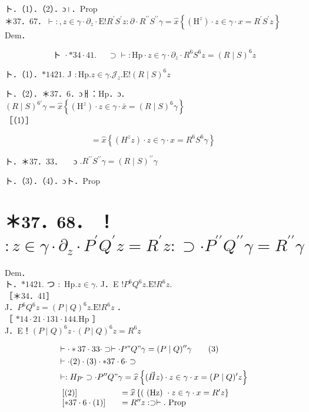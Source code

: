 \documentclass[10pt]{article}
\begin{document}
ト．（1）．（2）．ɔ।．Prop\\
＊37．67．$\vdash:, z \in \gamma \cdot \partial_{z} \cdot \mathrm{E}!R^{\prime} S^{\prime} z: \partial \cdot R^{\prime \prime} S^{\prime \prime} \gamma=\widehat{x}\left\{\left(\mathrm{H}^{z}\right) \cdot z \in \gamma \cdot x=R^{\prime} S^{\prime} z\right\}$ Dem．


\begin{equation*}
\text { ト } \cdot * 34 \cdot 41 \text {. } \quad \supset \vdash: \mathrm{Hp} \cdot z \in \gamma \cdot \partial_{z} \cdot R^{6} S^{6} z=(R \mid S)^{6} z \tag{1}
\end{equation*}


ト．（1）．$* 1421$. J $: \mathrm{Hp} . z \in \gamma . \mathcal{J}_{z} . \mathrm{E}!(R \mid S)^{6} z$

ト．（2）．＊37．6．ɔㅐ：Hp．ɔ．$(R \mid S)^{6 \prime} \gamma=\widehat{x}\left\{\left(\mathrm{H}^{z}\right) \cdot z \in \gamma \cdot \bar{x}=(R \mid S)^{6} \gamma\right\}$\\
［（1）］


\begin{equation*}
=\hat{x}\left\{\left(H^{z} z\right) \cdot z \in \gamma \cdot x=R^{6} S^{6} \gamma\right\} \tag{2}
\end{equation*}


ト．＊37．33．$\quad$ ɔ $. R^{\prime \prime} S^{\prime \prime} \gamma=(R \mid S)^{\prime \prime} \gamma$

ト．（3）．（4）．ɔト．Prop

\section*{＊37．68． ！$: z \in \gamma \cdot \partial_{z} \cdot P^{\prime} Q^{\prime} z=R^{\prime} z: \supset \cdot P^{\prime \prime} Q^{\prime \prime} \gamma=R^{\prime \prime} \gamma$}
Dem．\\
ト．$* 1421$. つ $:$ Hp.$z \in \gamma$. J．E $!P^{6} Q^{6} z . \mathrm{E}!R^{6} z$.\\
［＊34．41］\\
J．$P^{6} Q^{6} z=(P \mid Q)^{6} z . \mathrm{E}!R^{6} z$ ．\\
［ $* 14 \cdot 21 \cdot 131 \cdot 144 . \mathrm{Hp}$ ］\\
J．E！$(P \mid Q)^{6} z \cdot(P \mid Q)^{6} z=R^{6} z$


\begin{align*}
& \vdash \cdot * 37 \cdot 33 \cdot \supset \vdash \cdot P " Q " \gamma=(P \mid Q)^{\prime \prime} \gamma  \tag{3}\\
& \vdash \cdot(2) \cdot(3) \cdot * 37 \cdot 6 \cdot \supset \\
& \vdash: H p \cdot \supset \cdot P^{\prime \prime} Q " \gamma=\widehat{x}\left\{(\vec{H} z) \cdot z \in \gamma \cdot x=(P \mid Q)^{\prime} z\right\} \\
& \begin{array}{ll}
{[(2)]} & =\widehat{x}\left\{\left(\text { (Hz) } \cdot z \in \gamma \cdot x=R^{\prime} z\right\}\right. \\
{[* 37 \cdot 6 \cdot(1)] \quad} & =R^{\prime \prime} z: \supset \vdash . \text { Prop }
\end{array}
\end{align*}
\end{document}
